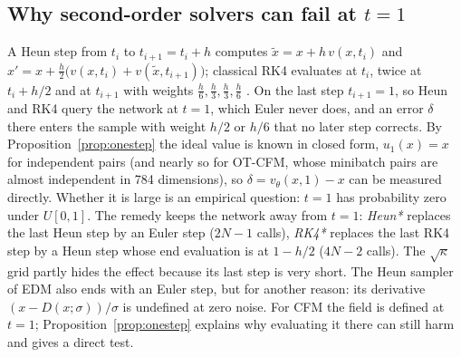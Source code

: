 \subsection{Why second-order solvers can fail at $t=1$}\label{sec:t1}
A Heun step from $t_i$ to $t_{i+1}=t_i+h$ computes $\tilde x=x+h\,v(x,t_i)$ and $x'=x+\frac h2\big(v(x,t_i)+v(\tilde x,t_{i+1})\big)$; classical RK4 evaluates at $t_i$, twice at $t_i+h/2$ and at $t_{i+1}$ with weights $\frac h6,\frac h3,\frac h3,\frac h6$ \citep[\S II.1]{hairer1993ode}. On the last step $t_{i+1}=1$, so Heun and RK4 query the network at $t=1$, which Euler never does, and an error $\delta$ there enters the sample with weight $h/2$ or $h/6$ that no later step corrects. By Proposition~\ref{prop:onestep} the ideal value is known in closed form, $u_1(x)=x$ for independent pairs (and nearly so for OT-CFM, whose minibatch pairs are almost independent in 784 dimensions), so $\delta=v_\theta(x,1)-x$ can be measured directly. Whether it is large is an empirical question: $t=1$ has probability zero under $U[0,1]$. The remedy keeps the network away from $t=1$: \emph{Heun*} replaces the last Heun step by an Euler step ($2N-1$ calls), \emph{RK4*} replaces the last RK4 step by a Heun step whose end evaluation is at $1-h/2$ ($4N-2$ calls). The $\sqrt\kappa$ grid partly hides the effect because its last step is very short. The Heun sampler of EDM \citep{karras2022edm} also ends with an Euler step, but for another reason: its derivative $(x-D(x;\sigma))/\sigma$ is undefined at zero noise. For CFM the field is defined at $t=1$; Proposition~\ref{prop:onestep} explains why evaluating it there can still harm and gives a direct test.
